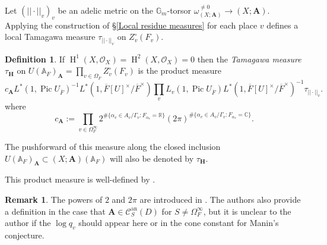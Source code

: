 \documentclass[a4paper,11pt,reqno]{amsart}
\newcommand{\R}{\mathbb{R}}
\newcommand{\C}{\mathbb{C}}
\newcommand{\G}{\mathbb{G}}
\newcommand{\A}{\mathbb{A}}
\DeclareMathOperator{\Pic}{Pic}
\DeclareMathOperator{\HH}{H}
\DeclareMathOperator{\an}{an}
\theoremstyle{definition}
\newtheorem{definition}[theorem]{Definition}
\newtheorem{remark}[theorem]{Remark}
\begin{document}
Let $(||\cdot||_v)_{v}$ be an adelic metric on the $\G_m$-torsor $\omega_{(X; \mathbf{A})}^{\neq 0} \to (X ; \mathbf{A})$. Applying the construction of \S\ref{Local residue measures} for each place $v$ defines a local Tamagawa measure $\tau_{||\cdot||_v}$ on $Z_v^{\circ}(F_v)$. 
\begin{definition}
	If $\HH^1(X, \mathcal{O}_X) = \HH^2(X, \mathcal{O}_X) = 0$ then the \emph{Tamagawa measure} $\tau_{\mathbf{H}}$ on $U(\A_F)_{\mathbf{A}} = \prod_{v \in \Omega_F} Z_v^{\circ}(F_v)$ is the product measure
	\begin{equation*}
		c_{\mathbf{A}}L^*(1, \Pic U_{\overline{F}})^{-1} L^*(1, \overline{F}[U]^{\times}/\overline{F}^{\times}) \prod_v L_v(1, \Pic U_{\overline{F}}) L^*(1, \overline{F}[U]^{\times}/\overline{F}^{\times})^{-1} \tau_{||\cdot||_v}.
	\end{equation*}
	where
	\begin{equation}\label{eq:Definition c_A}
		c_{\mathbf{A}} := \prod_{v \in \Omega_{F}^{\infty}} 2^{\#\{\alpha_v \in A_v/ \Gamma_v: F_{\alpha_v} = \R \}} (2 \pi)^{\#\{\alpha_v \in A_v/ \Gamma_v: F_{\alpha_v} = \C \}}.
	\end{equation}
	
	The pushforward of this measure along the closed inclusion $U(\A_F)_{\mathbf{A}} \subset (X ; \mathbf{A})(\A_F)$ will also be denoted by $\tau_{\mathbf{H}}$.
\end{definition}
This product measure is well-defined by \cite[Thm.~2.5]{Chambert-Loir2010Igusa}.
\begin{remark}
	The powers of $2$ and $2 \pi$ are introduced in \cite[p.~10]{Chambert-Loir2010Integral}. The authors also provide a definition in the case that $\mathbf{A} \in \mathcal{C}_{S}^{\an}(D)$ for $S \neq \Omega_{F}^{\infty}$, but it is unclear to the author if the $\log q_v$ should appear here or in the cone constant for Manin's conjecture.
\end{remark}
\end{document}

